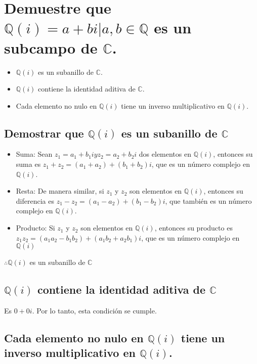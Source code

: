 \section{Demuestre que $\mathbb{Q}(i) = {a + bi | a, b \in \mathbb{Q}}$ es un subcampo de $\mathbb{C}$.}

\begin{itemize}
    \item $\mathbb{Q}(i)$ es un subanillo de $\mathbb{C}$.
    \item $\mathbb{Q}(i)$ contiene la identidad aditiva de $\mathbb{C}$.
    \item Cada elemento no nulo en $\mathbb{Q}(i)$ tiene un inverso multiplicativo en $\mathbb{Q}(i)$.
\end{itemize}

\subsection{Demostrar que $\mathbb{Q}(i)$ es un subanillo de $\mathbb{C}$}

\begin{itemize}
    \item Suma: Sean $z_1 = a_1 + b_1i y z_2 = a_2 + b_2i$ dos elementos en $\mathbb{Q}(i)$, entonces su suma es $z_1 + z_2 = (a_1 + a_2) + (b_1 + b_2)i$, que es un número complejo en $\mathbb{Q}(i)$.
    \item Resta: De manera similar, si $z_1$ y $z_2$ son elementos en $\mathbb{Q}(i)$, entonces su diferencia es $z_1 - z_2 = (a_1 - a_2) + (b_1 - b_2)i$, que también es un número complejo en $\mathbb{Q}(i)$.
    \item Producto: Si $z_1$ y $z_2$ son elementos en $\mathbb{Q}(i)$, entonces su producto es $z_1z_2 = (a_1a_2 - b_1b_2) + (a_1b_2 + a_2b_1)i$, que es un número complejo en $\mathbb{Q}(i)$
\end{itemize}

$\therefore \mathbb{Q}(i)$ es un subanillo de $\mathbb{C}$

\subsection{$\mathbb{Q}(i)$ contiene la identidad aditiva de $\mathbb{C}$}

Es $0 + 0i$. Por lo tanto, esta condición se cumple.

\subsection{Cada elemento no nulo en $\mathbb{Q}(i)$ tiene un inverso multiplicativo en $\mathbb{Q}(i)$.}

